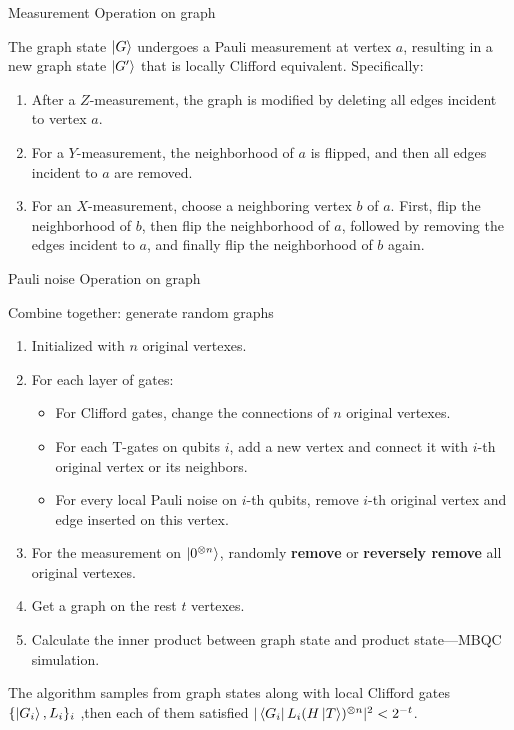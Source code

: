 \documentclass{beamer}
\begin{document}
\begin{frame}{Measurement Operation on graph}
    \begin{lemma}\label{lemma:Pauli_measurement_on_graph}
    The graph state $\ket{G}$ undergoes a Pauli measurement at vertex $a$, resulting in a new graph state $\ket{G'}$ that is locally Clifford equivalent. Specifically:
\begin{enumerate}
    \item After a $Z$-measurement, the graph is modified by deleting all edges incident to vertex $a$.
    \item For a $Y$-measurement, the neighborhood of $a$ is flipped, and then all edges incident to $a$ are removed.
    \item For an $X$-measurement, choose a neighboring vertex $b$ of $a$. First, flip the neighborhood of $b$, then flip the neighborhood of $a$, followed by removing the edges incident to $a$, and finally flip the neighborhood of $b$ again.
\end{enumerate}
\end{lemma}
\end{frame}

\begin{frame}{Pauli noise Operation on graph}
\color{red}{Generalized to Non-unital?}
\end{frame}

\begin{frame}{Combine together: generate random graphs}
\begin{enumerate}
    \item Initialized with $n$ original vertexes. 
    \item For each layer of gates:
    \begin{itemize}
        \item For Clifford gates, change the connections of $n$ original vertexes.
        \item For each T-gates on qubits $i$, add a new vertex and connect it with $i$-th original vertex or its neighbors.
        \item For every local Pauli noise on $i$-th qubits, remove $i$-th original vertex and edge inserted on this vertex.
    \end{itemize}
    \item For the measurement on $\ket{0^{\otimes n}}$, randomly \textbf{remove} or \textbf{reversely remove} all original vertexes.
    \item Get a graph on the rest $t$ vertexes. 
    \item Calculate the inner product between graph state and product state---MBQC simulation.
\end{enumerate}
\begin{theorem}\label{theo:variance_of_percolation_sampling}
    The algorithm samples from graph states along with local Clifford gates $\{\ket{G_i},L_i\}_i$ ,then each of them satisfied $|\bra{G_i}L_i(H\ket{T})^{\otimes n}|^2 < 2^{-t}$.   
\end{theorem}
\end{frame}
\end{document}
